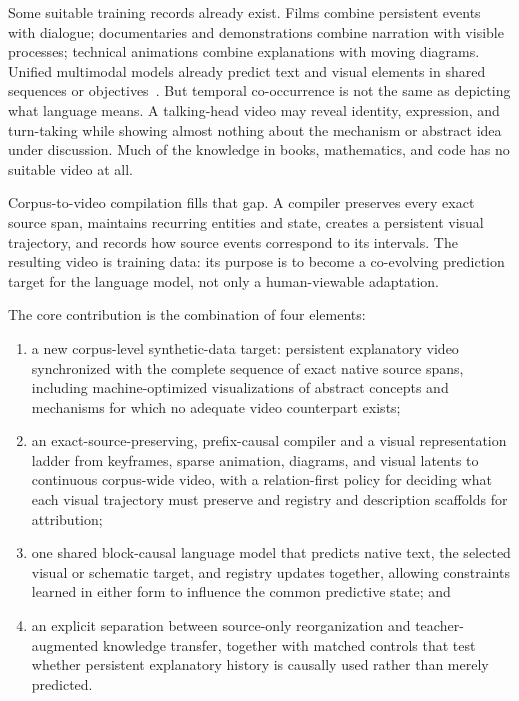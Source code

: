 \documentclass[11pt]{article}
\begin{document}
Some suitable training records already exist. Films combine persistent events with dialogue; documentaries and demonstrations combine narration with visible processes; technical animations combine explanations with moving diagrams. Unified multimodal models already predict text and visual elements in shared sequences or objectives~\cite{videobert,emu,emu35,tv2tv}. But temporal co-occurrence is not the same as depicting what language means. A talking-head video may reveal identity, expression, and turn-taking while showing almost nothing about the mechanism or abstract idea under discussion. Much of the knowledge in books, mathematics, and code has no suitable video at all.

Corpus-to-video compilation fills that gap. A compiler preserves every exact source span, maintains recurring entities and state, creates a persistent visual trajectory, and records how source events correspond to its intervals. The resulting video is training data: its purpose is to become a co-evolving prediction target for the language model, not only a human-viewable adaptation.

The core contribution is the combination of four elements:

\begin{enumerate}[leftmargin=1.6em,itemsep=2pt,topsep=3pt]
  \item a new corpus-level synthetic-data target: persistent explanatory video synchronized with the complete sequence of exact native source spans, including machine-optimized visualizations of abstract concepts and mechanisms for which no adequate video counterpart exists;
  \item an exact-source-preserving, prefix-causal compiler and a visual representation ladder from keyframes, sparse animation, diagrams, and visual latents to continuous corpus-wide video, with a relation-first policy for deciding what each visual trajectory must preserve and registry and description scaffolds for attribution;
  \item one shared block-causal language model that predicts native text, the selected visual or schematic target, and registry updates together, allowing constraints learned in either form to influence the common predictive state; and
  \item an explicit separation between source-only reorganization and teacher-augmented knowledge transfer, together with matched controls that test whether persistent explanatory history is causally used rather than merely predicted.
\end{enumerate}
\end{document}

